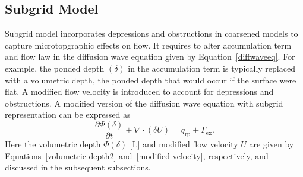 \documentclass[review,11pt]{elsarticle}
\begin{document}
\subsection{Subgrid Model}\label{subgridmodel}
Subgrid model incorporates depressions and obstructions in coarsened models to capture microtopgraphic effects on flow. It requires to alter accumulation term and flow law in the diffusion wave equation given by Equation~\ref{diffwaveeq}.
For example, the ponded depth $(\delta)$ in the accumulation term is typically replaced with a volumetric depth, the ponded depth that would occur if the surface were flat. A modified flow velocity is introduced to account for depressions and obstructions. A modified version of the diffusion wave equation with subgrid representation can be expressed as
\begin{equation}\label{diffwaveeq}
\frac{\partial \Phi (\delta)}{\partial t} + \nabla \cdot (\delta U)= q_\text{rp} + \Gamma_\text{ex}.
\end{equation}
Here the volumetric depth $\Phi (\delta)$ [L] and modified flow velocity $U$ are given by Equations~\ref{volumetric-depth2} and~\ref{modified-velocity}, respectively, and discussed in the subsequent subsections.
\end{document}
